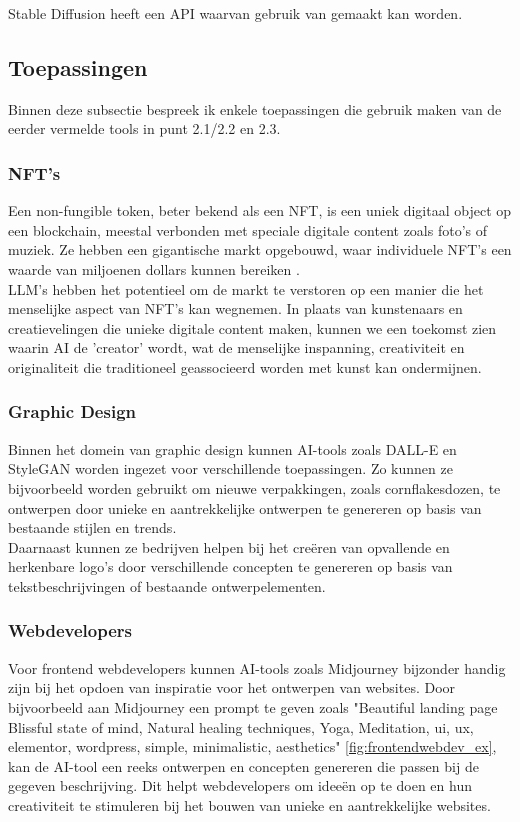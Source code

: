 Stable Diffusion heeft een API waarvan gebruik van gemaakt kan worden. \\

\pagebreak

\subsection{Toepassingen}
Binnen deze subsectie bespreek ik enkele toepassingen die gebruik maken van de eerder vermelde tools in punt 2.1/2.2 en 2.3.

\subsubsection{NFT's}
Een non-fungible token, beter bekend als een NFT, is een uniek digitaal object op een blockchain, meestal verbonden met speciale digitale content zoals foto's of muziek. Ze hebben een gigantische markt opgebouwd, waar individuele NFT's een waarde van miljoenen dollars kunnen bereiken \autocite{nft_whatisit}. \\

LLM's hebben het potentieel om de markt te verstoren op een manier die het menselijke aspect van NFT's kan wegnemen. In plaats van kunstenaars en creatievelingen die unieke digitale content maken, kunnen we een toekomst zien waarin AI de 'creator' wordt, wat de menselijke inspanning, creativiteit en originaliteit die traditioneel geassocieerd worden met kunst kan ondermijnen. 

\subsubsection{Graphic Design}
Binnen het domein van graphic design kunnen AI-tools zoals DALL-E en StyleGAN worden ingezet voor verschillende toepassingen. Zo kunnen ze bijvoorbeeld worden gebruikt om nieuwe verpakkingen, zoals cornflakesdozen, te ontwerpen door unieke en aantrekkelijke ontwerpen te genereren op basis van bestaande stijlen en trends.  \\

Daarnaast kunnen ze bedrijven helpen bij het creëren van opvallende en herkenbare logo's door verschillende concepten te genereren op basis van tekstbeschrijvingen of bestaande ontwerpelementen. 

\subsubsection{Webdevelopers}
Voor frontend webdevelopers kunnen AI-tools zoals Midjourney bijzonder handig zijn bij het opdoen van inspiratie voor het ontwerpen van websites. Door bijvoorbeeld aan Midjourney een prompt te geven zoals "Beautiful landing page Blissful state of mind, Natural healing techniques, Yoga, Meditation, ui, ux, elementor, wordpress, simple, minimalistic, aesthetics" \ref{fig:frontendwebdev_ex}, kan de AI-tool een reeks ontwerpen en concepten genereren die passen bij de gegeven beschrijving. Dit helpt webdevelopers om ideeën op te doen en hun creativiteit te stimuleren bij het bouwen van unieke en aantrekkelijke websites.

